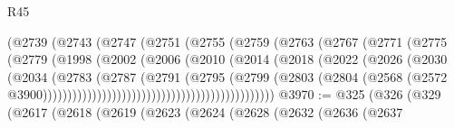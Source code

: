 \begin{lexlean}{R45}
\begin{coremodule}
                                      (@2739
                                        (@2743
                                          (@2747
                                            (@2751
                                              (@2755
                                                (@2759
                                                  (@2763
                                                    (@2767
                                                      (@2771
                                                        (@2775
                                                          (@2779
                                                            (@1998
                                                              (@2002
                                                                (@2006
                                                                  (@2010
                                                                    (@2014
                                                                      (@2018
                                                                        (@2022
                                                                          (@2026
                                                                            (@2030
                                                                              (@2034
                                                                                (@2783
                                                                                  (@2787
                                                                                    (@2791
                                                                                      (@2795
                                                                                        (@2799
                                                                                          (@2803
                                                                                            (@2804
                                                                                              (@2568
                                                                                                (@2572
                                                                                                  @3900)))))))))))))))))))))))))))))))))))))))))))))))
@3970 := @325
    (@326
      (@329
        (@2617
          (@2618
            (@2619
              (@2623
                (@2624
                  (@2628
                    (@2632
                      (@2636
                        (@2637

\end{coremodule}
\end{lexlean}
